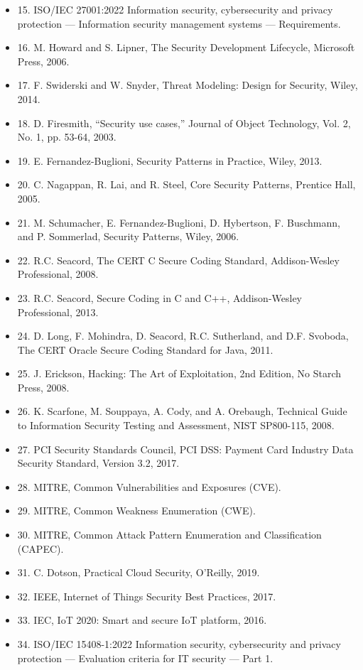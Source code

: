 \begin{itemize}[leftmargin=2em]
\item 15. ISO/IEC 27001:2022 Information security, cybersecurity and privacy protection — Information security management systems — Requirements.
\item 16. M. Howard and S. Lipner, The Security Development Lifecycle, Microsoft Press, 2006.
\item 17. F. Swiderski and W. Snyder, Threat Modeling: Design for Security, Wiley, 2014.
\item 18. D. Firesmith, “Security use cases,” Journal of Object Technology, Vol. 2, No. 1, pp. 53-64, 2003.
\item 19. E. Fernandez-Buglioni, Security Patterns in Practice, Wiley, 2013.
\item 20. C. Nagappan, R. Lai, and R. Steel, Core Security Patterns, Prentice Hall, 2005.
\item 21. M. Schumacher, E. Fernandez-Buglioni, D. Hybertson, F. Buschmann, and P. Sommerlad, Security Patterns, Wiley, 2006.
\item 22. R.C. Seacord, The CERT C Secure Coding Standard, Addison-Wesley Professional, 2008.
\item 23. R.C. Seacord, Secure Coding in C and C++, Addison-Wesley Professional, 2013.
\item 24. D. Long, F. Mohindra, D. Seacord, R.C. Sutherland, and D.F. Svoboda, The CERT Oracle Secure Coding Standard for Java, 2011.
\item 25. J. Erickson, Hacking: The Art of Exploitation, 2nd Edition, No Starch Press, 2008.
\item 26. K. Scarfone, M. Souppaya, A. Cody, and A. Orebaugh, Technical Guide to Information Security Testing and Assessment, NIST SP800-115, 2008.
\item 27. PCI Security Standards Council, PCI DSS: Payment Card Industry Data Security Standard, Version 3.2, 2017.
\item 28. MITRE, Common Vulnerabilities and Exposures (CVE).
\item 29. MITRE, Common Weakness Enumeration (CWE).
\item 30. MITRE, Common Attack Pattern Enumeration and Classification (CAPEC).
\item 31. C. Dotson, Practical Cloud Security, O’Reilly, 2019.
\item 32. IEEE, Internet of Things Security Best Practices, 2017.
\item 33. IEC, IoT 2020: Smart and secure IoT platform, 2016.
\item 34. ISO/IEC 15408-1:2022 Information security, cybersecurity and privacy protection — Evaluation criteria for IT security — Part 1.

\end{itemize}
